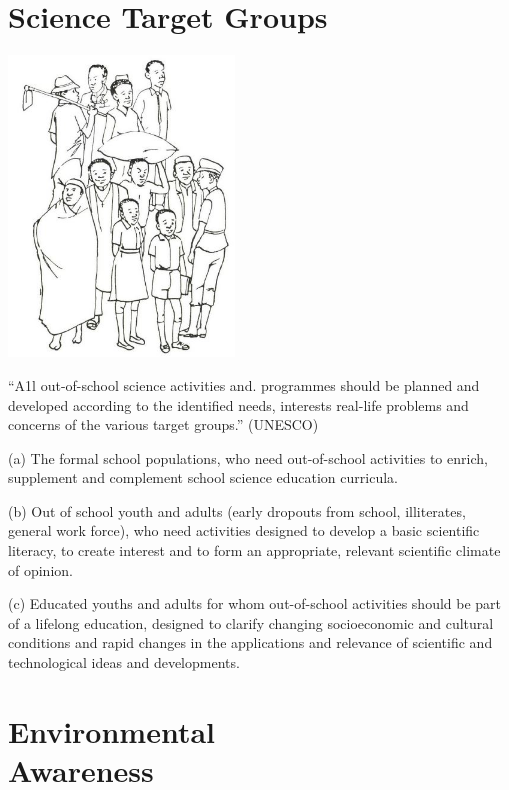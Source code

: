\begin{multicols}{2}
\section{Science Target Groups}

\begin{center}
\includegraphics[width=0.45\textwidth]{./img/source/target-groups.jpg}
\end{center}

``A1l out-of-school science activities and.
programmes should be planned and developed
according to the identified needs, interests
real-life problems and concerns of the various
target groups.'' (UNESCO)

(a) The formal school populations, who need
out-of-school activities to enrich, supplement
and complement school science education
curricula.

(b) Out of school youth and adults (early
dropouts from school, illiterates, general work
force), who need activities designed to develop
a basic scientific literacy, to create interest and
to form an appropriate, relevant scientific
climate of opinion.

(c) Educated youths and adults for whom out-of-school activities should be part of a lifelong
education, designed to clarify changing socioeconomic
and cultural conditions and rapid
changes in the applications and relevance of
scientific and technological ideas and
developments.


\section{Environmental \hfill \\ Awareness}


\end{multicols}
